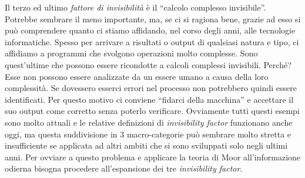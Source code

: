 Il terzo ed ultimo \textit{fattore di invisibilità} è il “calcolo complesso invisibile”. Potrebbe sembrare il meno importante, ma, se ci si ragiona bene, grazie ad esso si può comprendere quanto ci stiamo affidando, nel corso degli anni, alle tecnologie informatiche. 
Spesso per arrivare a risultati o output di qualsiasi natura e tipo, ci affidiamo a programmi che svolgono operazioni molto complesse. Sono quest’ultime che possono essere ricondotte a calcoli complessi invisibili. Perché? Esse non possono essere analizzate da un essere umano a causa della loro complessità. Se dovessero esserci errori nel processo non potrebbero quindi essere identificati. Per questo motivo ci conviene “fidarci della macchina” e accettare il suo output come corretto senza poterlo verificare. 
Ovviamente tutti questi esempi sono molto attuali e le relative definizioni di \textit{invisibility factor} funzionano anche oggi, ma questa suddivisione in 3 macro-categorie può sembrare molto stretta e insufficiente se applicata ad altri ambiti che si sono sviluppati solo negli ultimi anni.
Per ovviare a questo problema e applicare la teoria di Moor all’informazione odierna bisogna procedere all’espansione dei tre \textit{invisibility factor}.